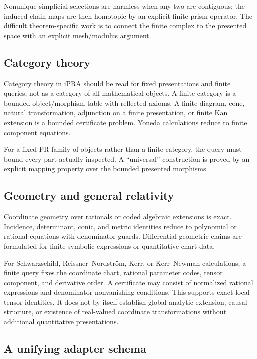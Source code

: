 Nonunique simplicial selections are harmless when any two are contiguous; the
induced chain maps are then homotopic by an explicit finite prism operator.
The difficult theorem-specific work is to connect the finite complex to the
presented space with an explicit mesh/modulus argument.

\subsection{Category theory}

Category theory in iPRA should be read for fixed presentations and finite
queries, not as a category of all mathematical objects.  A finite category is
a bounded object/morphism table with reflected axioms.  A finite diagram,
cone, natural transformation, adjunction on a finite presentation, or finite
Kan extension is a bounded certificate problem.  Yoneda calculations reduce to
finite component equations.

For a fixed PR family of objects rather than a finite category, the query must
bound every part actually inspected.  A ``universal'' construction is proved by
an explicit mapping property over the bounded presented morphisms.

\subsection{Geometry and general relativity}

Coordinate geometry over rationals or coded algebraic extensions is exact.
Incidence, determinant, conic, and metric identities reduce to polynomial or
rational equations with denominator guards.  Differential-geometric claims are
formulated for finite symbolic expressions or quantitative chart data.

For Schwarzschild, Reissner--Nordstr\"om, Kerr, or Kerr--Newman calculations,
a finite query fixes the coordinate chart, rational parameter codes, tensor
component, and derivative order.  A certificate may consist of normalized
rational expressions and denominator nonvanishing conditions.  This supports
exact local tensor identities.  It does not by itself establish global
analytic extension, causal structure, or existence of real-valued coordinate
transformations without additional quantitative presentations.

\subsection{A unifying adapter schema}

